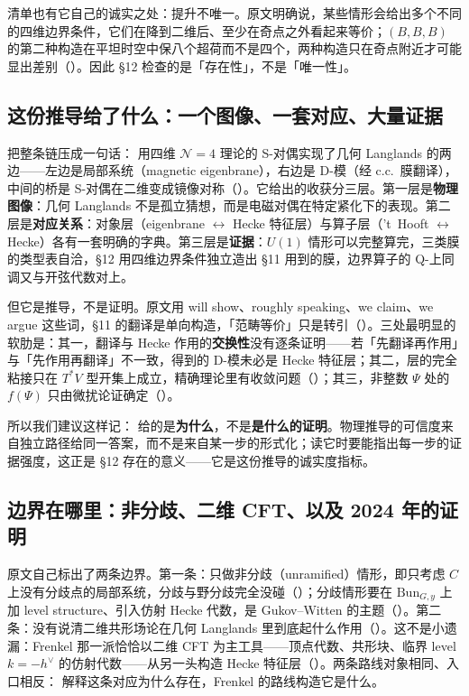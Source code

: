 清单也有它自己的诚实之处：提升不唯一。原文明确说，某些情形会给出多个不同的四维边界条件，它们在降到二维后、至少在奇点之外看起来等价；$(B,B,B)$ 的第二种构造在平坦时空中保八个超荷而不是四个，两种构造只在奇点附近才可能显出差别（）。因此 \S12 检查的是「存在性」，不是「唯一性」。

\subsection{这份推导给了什么：一个图像、一套对应、大量证据}

把整条链压成一句话：\kw{} 用四维 $\mathcal N=4$ 理论的 S-对偶实现了几何 Langlands 的两边——左边是局部系统（magnetic eigenbrane），右边是 D-模（经 c.c.\ 膜翻译），中间的桥是 S-对偶在二维变成镜像对称（\cite{kw06}）。它给出的收获分三层。第一层是\textbf{物理图像}：几何 Langlands 不是孤立猜想，而是电磁对偶在特定紧化下的表现。第二层是\textbf{对应关系}：对象层（eigenbrane $\leftrightarrow$ Hecke 特征层）与算子层（'t~Hooft $\leftrightarrow$ Hecke）各有一套明确的字典。第三层是\textbf{证据}：$U(1)$ 情形可以完整算完，三类膜的类型表自洽，\S12 用四维边界条件独立造出 \S11 用到的膜，边界算子的 Q-上同调又与开弦代数对上。

但它是推导，不是证明。原文用 will show、roughly speaking、we claim、we argue 这些词，\S11 的翻译是单向构造，「范畴等价」只是转引（）。三处最明显的软肋是：其一，翻译与 Hecke 作用的\textbf{交换性}没有逐条证明——若「先翻译再作用」与「先作用再翻译」不一致，得到的 D-模未必是 Hecke 特征层；其二，层的完全粘接只在 $T^*V$ 型开集上成立，精确理论里有收敛问题（）；其三，非整数 $\Psi$ 处的 $f(\Psi)$ 只由微扰论证确定（）。

所以我们建议这样记：\kw{} 给的是\textbf{为什么}，不是\textbf{是什么的证明}。物理推导的可信度来自独立路径给同一答案，而不是来自某一步的形式化；读它时要能指出每一步的证据强度，这正是 \S12 存在的意义——它是这份推导的诚实度指标。

\subsection{边界在哪里：非分歧、二维 CFT、以及 2024 年的证明}

原文自己标出了两条边界。第一条：只做非分歧（unramified）情形，即只考虑 $C$ 上没有分歧点的局部系统，分歧与野分歧完全没碰（）；分歧情形要在 $\mathrm{Bun}_{G,y}$ 上加 level structure、引入仿射 Hecke 代数，是 Gukov--Witten 的主题（\cite{gw06}）。第二条：没有说清二维共形场论在几何 Langlands 里到底起什么作用（）。这不是小遗漏：Frenkel 那一派恰恰以二维 CFT 为主工具——顶点代数、共形块、临界 level $k=-h^\vee$ 的仿射代数——从另一头构造 Hecke 特征层（\cite{fr09}）。两条路线对象相同、入口相反：\kw{} 解释这条对应为什么存在，Frenkel 的路线构造它是什么。

